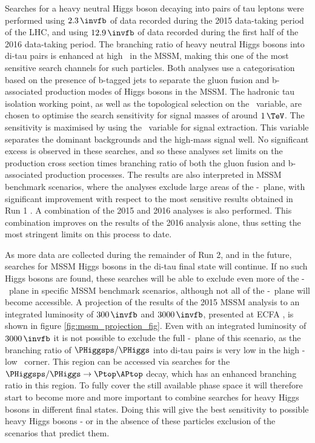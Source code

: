 Searches for a heavy neutral Higgs boson decaying into pairs of tau leptons were performed
using $2.3\,\invfb$ of data recorded during the 2015
data-taking period of the \ac{LHC}, and using $12.9\,\invfb$ of 
data recorded during the first half of the 2016 data-taking period. The 
branching ratio of heavy neutral Higgs bosons into di-tau pairs is enhanced at high \tanb~in the \ac{MSSM},
making this one of the most sensitive search channels for such particles. Both analyses use a categorisation 
based on the presence of b-tagged jets to separate
the gluon fusion and b-associated production modes of Higgs bosons in the \ac{MSSM}. 
The hadronic tau isolation working point, as well as the topological selection on 
the \mT~variable, are chosen to optimise the search sensitivity for signal
masses of around $1\,\TeV$.
The sensitivity is maximised by using the \mTtot~variable for signal extraction.
This variable separates the dominant backgrounds
and the high-mass signal well.
No significant excess is observed in these searches, and so 
these analyses set limits on the production cross section times branching ratio of both the
gluon fusion and b-associated production processes. The results are also
interpreted in MSSM benchmark scenarios, where the analyses exclude large areas
of the \mA-\tanb~plane, with significant improvement with respect to the most sensitive
results obtained in Run 1 \cite{CMS-PAS-HIG-16-006,CMS-PAS-HIG-16-037}. A combination of the 2015 and 2016 analyses is also
performed. This combination improves on the results of the 2016 analysis alone, thus
setting the most stringent limits on this process to date.

As more data are collected during the remainder of Run 2, and in the 
future, searches for MSSM Higgs bosons in the di-tau final
state will continue. If no such Higgs bosons are found, these searches
will be able to exclude even more of the \mA-\tanb~plane in specific
MSSM benchmark scenarios, although not all of the \mA-\tanb~plane
will become accessible. A projection of the results of the 2015 \ac{MSSM}
analysis to an integrated luminosity of $300\,\invfb$ and $3000\,\invfb$, presented at ECFA \cite{HTT-projection}, is
shown in figure \ref{fig:mssm_projection_fig}. Even with an integrated luminosity of
$3000\,\invfb$ it is not possible to exclude the full \mA-\tanb~plane of this scenario,
as the branching ratio of $\PHiggsps/\PHiggs$ into di-tau pairs 
is very low in the high \mA-low \tanb~corner. This region can be accessed 
via searches for the $\PHiggsps/\PHiggs \rightarrow \Ptop\APtop$ decay, which
has an enhanced branching ratio in this region. To fully cover the still
available phase space it will therefore start to become more and more
important to combine searches for heavy Higgs bosons in different final states.
Doing this will give the best sensitivity to possible
heavy Higgs bosons - or in the absence of these particles exclusion
of the scenarios that predict them.

